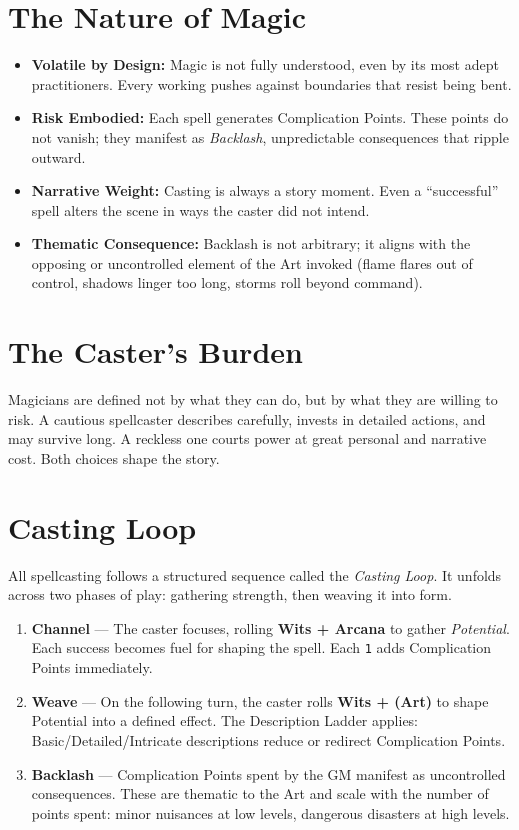 \documentclass[12pt]{article}
\begin{document}
\section{The Nature of Magic}
\begin{itemize}
  \item \textbf{Volatile by Design:} Magic is not fully understood, even by its most adept practitioners. Every working pushes against boundaries that resist being bent.  
  \item \textbf{Risk Embodied:} Each spell generates Complication Points. These points do not vanish; they manifest as \emph{Backlash}, unpredictable consequences that ripple outward.  
  \item \textbf{Narrative Weight:} Casting is always a story moment. Even a “successful” spell alters the scene in ways the caster did not intend.  
  \item \textbf{Thematic Consequence:} Backlash is not arbitrary; it aligns with the opposing or uncontrolled element of the Art invoked (flame flares out of control, shadows linger too long, storms roll beyond command).  
\end{itemize}

\section{The Caster’s Burden}
Magicians are defined not by what they can do, but by what they are willing to risk.  
A cautious spellcaster describes carefully, invests in detailed actions, and may survive long. A reckless one courts power at great personal and narrative cost. Both choices shape the story.

\section{Casting Loop}

All spellcasting follows a structured sequence called the \emph{Casting Loop}.  
It unfolds across two phases of play: gathering strength, then weaving it into form.

\begin{enumerate}
  \item \textbf{Channel} — The caster focuses, rolling \textbf{Wits + Arcana} to gather \emph{Potential}.  
  Each success becomes fuel for shaping the spell. Each \texttt{1} adds Complication Points immediately.  
  \item \textbf{Weave} — On the following turn, the caster rolls \textbf{Wits + (Art)} to shape Potential into a defined effect.  
  The Description Ladder applies: Basic/Detailed/Intricate descriptions reduce or redirect Complication Points.  
  \item \textbf{Backlash} — Complication Points spent by the GM manifest as uncontrolled consequences.  
  These are thematic to the Art and scale with the number of points spent: minor nuisances at low levels, dangerous disasters at high levels.  
\end{enumerate}
\end{document}
